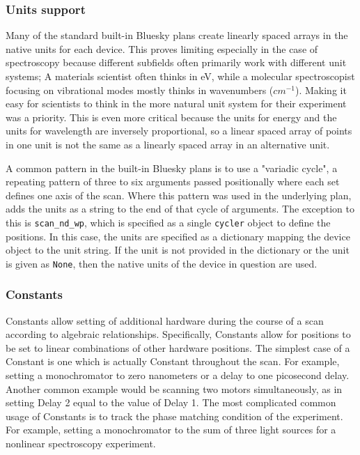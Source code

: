 \subsubsection{Units support}

Many of the standard built-in Bluesky plans create linearly spaced arrays in the native units for each device.
This proves limiting especially in the case of spectroscopy because different subfields often primarily work with different unit systems; A materials scientist often thinks in eV, while a molecular spectroscopist focusing on vibrational modes mostly thinks in wavenumbers ($cm^{-1}$).
Making it easy for scientists to think in the more natural unit system for their experiment was a priority.
This is even more critical because the units for energy and the units for wavelength are inversely proportional, so a linear spaced array of points in one unit is not the same as a linearly spaced array in an alternative unit.

A common pattern in the built-in Bluesky plans is to use a "variadic cycle", a repeating pattern of three to six arguments passed positionally where each set defines one axis of the scan.
Where this pattern was used in the underlying plan, \wrightplans adds the units as a string to the end of that cycle of arguments.
The exception to this is \texttt{scan\_nd\_wp}, which is specified as a single \texttt{cycler}\cite{} object to define the positions.
In this case, the units are specified as a dictionary mapping the device object to the unit string.
If the unit is not provided in the dictionary or the unit is given as \texttt{None}, then the native units of the device in question are used.

\subsubsection{Constants}

Constants allow setting of additional hardware during the course of a scan according to algebraic relationships.
Specifically, Constants allow for positions to be set to linear combinations of other hardware positions.
The simplest case of a Constant is one which is actually Constant throughout the scan.
For example, setting a monochromator to zero nanometers or a delay to one picosecond delay.
Another common example would be scanning two motors simultaneously, as in setting Delay 2 equal to the value of Delay 1.
The most complicated common usage of Constants is to track the phase matching condition of the experiment.
For example, setting a monochromator to the sum of three light sources for a nonlinear spectroscopy experiment.

